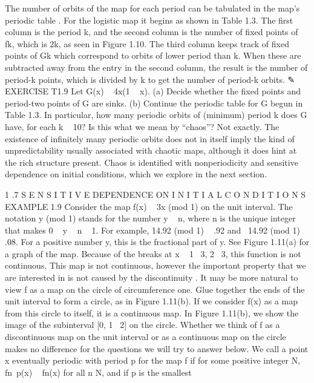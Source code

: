 \documentclass{article}
\begin{document}
The number of orbits of the map for each period can be tabulated in the
map’s periodic table . For the logistic map it begins as shown in Table 1.3. The
first column is the period k, and the second column is the number of fixed points
of fk, which is 2k, as seen in Figure 1.10. The third column keeps track of fixed
points of Gk which correspond to orbits of lower period than k. When these are
subtracted away from the entry in the second column, the result is the number of
period-k points, which is divided by k to get the number of period-k orbits.
✎ EXERCISE T1.9
Let G(x)   4x(1   x).
(a) Decide whether the fixed points and period-two points of G are
sinks.
(b) Continue the periodic table for G begun in Table 1.3. In particular,
how many periodic orbits of (minimum) period k does G have, for each
k   10?
Is this what we mean by “chaos”? Not exactly. The existence of infinitely
many periodic orbits does not in itself imply the kind of unpredictability usually
associated with chaotic maps, although it does hint at the rich structure present.
Chaos is identified with nonperiodicity and sensitive dependence on initial conditions,
which we explore in the next section.

1 .7 S E N S I T I V E DEPENDENCE ON
I N I T I A L C O N D I T I O N S
EXAMPLE 1.9
Consider the map f(x)   3x (mod 1) on the unit interval. The notation y
(mod 1) stands for the number y   n, where n is the unique integer that makes
0   y   n   1. For example, 14.92 (mod 1)   .92 and  14.92 (mod 1)   .08.
For a positive number y, this is the fractional part of y. See Figure 1.11(a) for
a graph of the map. Because of the breaks at x   1  3, 2  3, this function is not
continuous.
This map is not continuous, however the important property that we are
interested in is not caused by the discontinuity . It may be more natural to view
f as a map on the circle of circumference one. Glue together the ends of the unit
interval to form a circle, as in Figure 1.11(b). If we consider f(x) as a map from
this circle to itself, it is a continuous map. In Figure 1.11(b), we show the image
of the subinterval [0, 1  2] on the circle. Whether we think of f as a discontinuous
map on the unit interval or as a continuous map on the circle makes no difference
for the questions we will try to answer below.
We call a point x eventually periodic with period p for the map f if for
some positive integer N, fn p(x)   fn(x) for all n 
 N, and if p is the smallest
\end{document}
